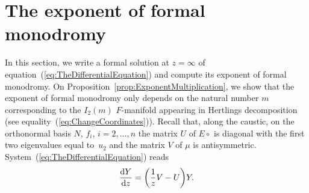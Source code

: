 \documentclass[10pt,a4paper]{amsart}
\numberwithin{equation}{section}
\begin{document}
\section{The exponent of formal monodromy}
 \label{sec:ExponentOfFormalMonodromy}
 In this section, we write a formal solution at $z=\infty$ of equation~(\ref{eq:TheDifferentialEquation}) and compute its exponent of formal monodromy. On Proposition~\ref{prop:ExponentMultiplication}, we show that the exponent of formal monodromy only depends on the natural number $m$ corresponding to the $I_{2}(m)$ $F$-manifold appearing in Hertlings decomposition (see equality~(\ref{eq:ChangeCoordinates})). Recall that, along the caustic, on the orthonormal basis $N$, $f_{i}$, $i=2,\dots, n$ the matrix $U$ of $E\circ$ is diagonal with the first two eigenvalues equal to~$u_{2}$ and the matrix $V$ of $\mu$ is antisymmetric. System~(\ref{eq:TheDifferentialEquation}) reads
 \begin{equation*}
 \frac{{\rm d}Y}{{\rm d}z}=\biggl( \frac{1}{z}V-U\biggr)Y.
 \end{equation*}
\end{document}
